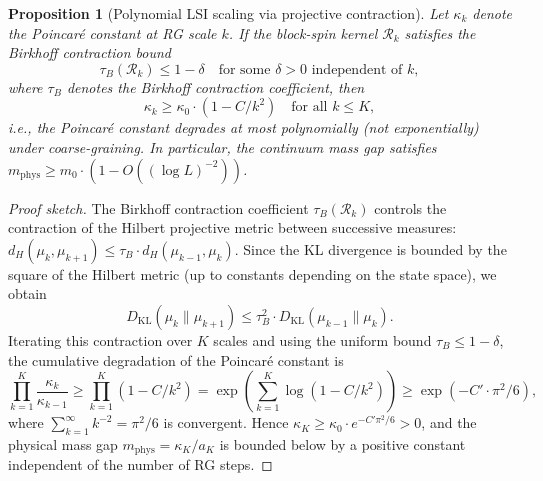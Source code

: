 \documentclass[12pt,a4paper]{article}
\theoremstyle{definition}
\theoremstyle{plain}
\newtheorem{proposition}[definition]{Proposition}
\theoremstyle{remark}
\begin{document}
\begin{proposition}[Polynomial LSI scaling via projective contraction]
\label{prop:polynomial-lsi}
Let $\kappa_k$ denote the Poincar\'e constant at RG scale $k$. If the block-spin kernel $\mathcal{R}_k$ satisfies the Birkhoff contraction bound
\[
\tau_B(\mathcal{R}_k) \leq 1 - \delta \quad \text{for some } \delta > 0 \text{ independent of } k,
\]
where $\tau_B$ denotes the Birkhoff contraction coefficient, then
\[
\kappa_k \geq \kappa_0 \cdot (1 - C/k^2) \quad \text{for all } k \leq K,
\]
i.e., the Poincar\'e constant degrades at most polynomially (not exponentially) under coarse-graining. In particular, the continuum mass gap satisfies $m_{\mathrm{phys}} \geq m_0 \cdot (1 - O((\log L)^{-2}))$.
\end{proposition}

\begin{proof}[Proof sketch]
The Birkhoff contraction coefficient $\tau_B(\mathcal{R}_k)$ controls the contraction of the Hilbert projective metric between successive measures: $d_H(\mu_k, \mu_{k+1}) \leq \tau_B \cdot d_H(\mu_{k-1}, \mu_k)$. Since the KL divergence is bounded by the square of the Hilbert metric (up to constants depending on the state space), we obtain
\[
D_{\mathrm{KL}}(\mu_k \| \mu_{k+1}) \leq \tau_B^2 \cdot D_{\mathrm{KL}}(\mu_{k-1} \| \mu_k).
\]
Iterating this contraction over $K$ scales and using the uniform bound $\tau_B \leq 1 - \delta$, the cumulative degradation of the Poincar\'e constant is
\[
\prod_{k=1}^{K} \frac{\kappa_k}{\kappa_{k-1}} \geq \prod_{k=1}^{K} (1 - C/k^2) = \exp\!\left(\sum_{k=1}^{K} \log(1 - C/k^2)\right) \geq \exp(-C' \cdot \pi^2/6),
\]
where $\sum_{k=1}^{\infty} k^{-2} = \pi^2/6$ is convergent. Hence $\kappa_K \geq \kappa_0 \cdot e^{-C'\pi^2/6} > 0$, and the physical mass gap $m_{\mathrm{phys}} = \kappa_K / a_K$ is bounded below by a positive constant independent of the number of RG steps.
\end{proof}
\end{document}
